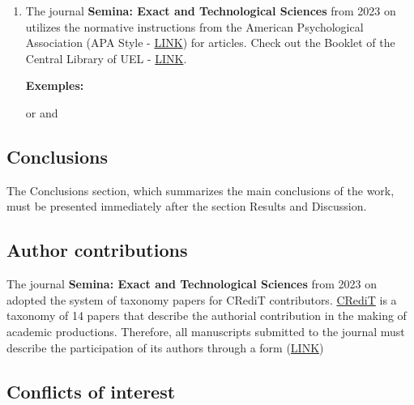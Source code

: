 \documentclass[twoside, 11pt]{article}
\begin{document}
\begin{enumerate}
\begin{itemize}
In equation \eqref{eq1}, ...
      \end{itemize}

      \item The journal \textbf{Semina: Exact and Technological Sciences} from 2023 on utilizes the normative instructions from the American Psychological Association (APA Style - \textcolor{blue}{\href{https://apastyle.apa.org/}{LINK}}) for articles. Check out the Booklet of the Central Library of UEL - \textcolor{blue}{\href{https://sites.uel.br/bibliotecas/wp-content/uploads/2022/03/APOSTILAESTILOAPA.pdf}{LINK}}.
      
      \textbf{Exemples:}

      \parencite{Cirilo2023, Herbert2023}  or  \textcite{Cirilo2023} and  \textcite{Herbert2023}
\end{enumerate}



 
\subsection*{Conclusions}



The Conclusions section, which summarizes the main conclusions of the work, must be presented immediately after the section Results and Discussion.

 




\subsection*{Author contributions}

The journal \textbf{Semina: Exact and Technological Sciences} from 2023 on adopted the system of taxonomy papers for CRediT contributors. \textcolor{blue}{\href{https://ojs.uel.br/revistas/uel/index.php/semexatas/form}{CRediT}}  is a taxonomy of 14 papers that describe the authorial contribution in the making of academic productions. Therefore, all manuscripts submitted to the journal must describe the participation of its authors through a form (\textcolor{blue}{\href{https://ojs.uel.br/revistas/uel/index.php/semexatas/form}{LINK}})


\vspace{-0.05cm}

\subsection*{Conflicts of interest}
\end{document}
